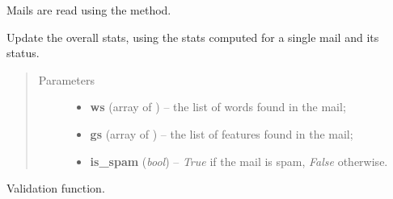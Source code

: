 \documentclass[letterpaper,10pt,english]{sphinxmanual}
\begin{document}
\begin{fulllineitems}
\begin{fulllineitems}
Mails are read using the {\hyperref[index:naive_bayes.Bayes.load_mails]{}} method.

\end{fulllineitems}


\begin{fulllineitems}
\label{index:naive_bayes.Bayes.update_stats}
Update the overall stats, using the stats computed for a single mail
and its status.
\begin{quote}\begin{description}
\item[{Parameters}] \leavevmode\begin{itemize}
\item {} 
\textbf{ws} (array of {\hyperref[index:test_stat.Test_word]{}}) -- the list of words found in the mail;

\item {} 
\textbf{gs} (array of {\hyperref[index:test_stat.Test_stat]{}}) -- the list of features found in the mail;

\item {} 
\textbf{is\_spam} (\emph{bool}) -- \emph{True} if the mail is spam, \emph{False} otherwise.

\end{itemize}

\end{description}\end{quote}

\end{fulllineitems}


\begin{fulllineitems}
\label{index:naive_bayes.Bayes.validate}
Validation function.


\end{fulllineitems}
\end{fulllineitems}
\end{document}
